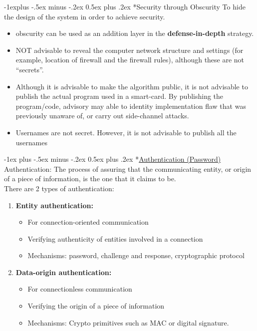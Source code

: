 \documentclass[10pt,landscape]{article}
\makeatletter
\renewcommand{\section}{\@startsection{section}{1}{0mm}%
                                {-1ex plus -.5ex minus -.2ex}%
                                {0.5ex plus .2ex}%
                                {\normalfont\large\bfseries}}
\renewcommand{\subsection}{\@startsection{subsection}{2}{0mm}%
                                {-1explus -.5ex minus -.2ex}%
                                {0.5ex plus .2ex}%
                                {\normalfont\normalsize\bfseries}}
\makeatother
\begin{document}
\begin{multicols*}{3}
\subsection*{Security through Obscurity}
To hide the design of the system in order to achieve security. 
\begin{itemize}[noitemsep,wide=0pt, leftmargin=\dimexpr{} + 2\relax]
    \item obscurity can be used as an addition layer in the \textbf{defense-in-depth}
    strategy.
    \item NOT advisable to reveal the computer network structure and settings (for example,
    location of firewall and the firewall rules), although these are not “secrets”.
    \item Although it is advisable to make the algorithm public, it is not advisable to publish the
    actual program used in a smart-card. By publishing the program/code, advisory may
    able to identity implementation flaw that was previously unaware of, or carry out
    side-channel attacks. 
    \item Usernames are not secret. However, it is not advisable to publish all the usernames
\end{itemize}

\section*{\underline{Authentication (Password)}}
Authentication: The process of assuring that the communicating
entity, or origin of a piece of information, is the one that it claims to
be. \\ 

There are 2 types of authentication:

\begin{enumerate}[noitemsep,wide=0pt, leftmargin=\dimexpr\labelwidth + 2\labelsep\relax]
    \item \textbf{Entity authentication:}
        \begin{itemize}[noitemsep,wide=0pt, leftmargin=\dimexpr{} + 2\relax]
            \item For connection-oriented communication
            \item Verifying authenticity of entities involved in a connection
            \item Mechanisms: password, challenge and response, cryptographic protocol
        \end{itemize}
    \item \textbf{Data-origin authentication:}
        \begin{itemize}[noitemsep,wide=0pt, leftmargin=\dimexpr{} + 2\relax]
            \item For connectionless communication
            \item Verifying the origin of a piece of information
            \item Mechanisms: Crypto primitives such as MAC or digital signature. 
        \end{itemize}
\end{enumerate}

\end{multicols*}
\end{document}

